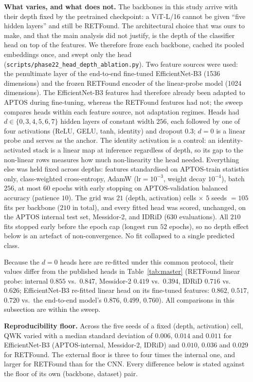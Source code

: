 \documentclass[11pt,a4paper]{article}
\begin{document}
\textbf{What varies, and what does not.} The backbones in this study arrive with
their depth fixed by the pretrained checkpoint: a ViT-L/16 cannot be given
``five hidden layers'' and still be RETFound. The architectural choice that was
ours to make, and that the main analysis did not justify, is the depth of the
classifier head on top of the features. We therefore froze each backbone, cached
its pooled embeddings once, and swept only the head
(\texttt{scripts/}\allowbreak\texttt{phase22\_head\_depth\_ablation.py}). Two feature sources were
used: the penultimate layer of the end-to-end fine-tuned EfficientNet-B3
(1536 dimensions) and the frozen RETFound encoder of the linear-probe model (1024 dimensions).
The EfficientNet-B3 features had therefore already been adapted to APTOS during
fine-tuning, whereas the RETFound features had not; the sweep compares heads
within each feature source, not adaptation regimes. Heads had
$d\in\{0,3,4,5,6,7\}$ hidden layers of constant width $256$, each followed by one
of four activations (ReLU, GELU, tanh, identity) and dropout $0.3$; $d=0$ is a
linear probe and serves as the anchor. The identity activation is a control: an
identity-activated stack is a linear map at inference regardless of depth, so its
gap to the non-linear rows measures how much non-linearity the head needed.
Everything else was held fixed across depths: features standardised on APTOS-train
statistics only, class-weighted cross-entropy, AdamW ($\text{lr}=10^{-3}$, weight
decay $10^{-4}$), batch $256$, at most $60$ epochs with early stopping on
APTOS-validation balanced accuracy (patience $10$). The grid was
$21$ (depth, activation) cells $\times$ $5$ seeds $=105$ fits per backbone
($210$ in total), and every fitted head was scored, unchanged, on the APTOS
internal test set, Messidor-2, and IDRiD ($630$ evaluations). All $210$ fits
stopped early before the epoch cap (longest run $52$ epochs), so no depth effect
below is an artefact of non-convergence. No fit collapsed to a single predicted
class.

Because the $d=0$ heads here are re-fitted under this common protocol, their
values differ from the published heads in Table~\ref{tab:master} (RETFound linear
probe: internal $0.855$ vs.\ $0.847$, Messidor-2 $0.419$ vs.\ $0.394$, IDRiD
$0.716$ vs.\ $0.626$; EfficientNet-B3 re-fitted linear head on its fine-tuned
features: $0.862$, $0.517$, $0.720$ vs.\ the end-to-end model's $0.876$,
$0.499$, $0.760$). All comparisons in this subsection are within the sweep.

\textbf{Reproducibility floor.} Across the five seeds of a fixed (depth,
activation) cell, QWK varied with a median standard deviation of $0.006$, $0.014$
and $0.011$ for EfficientNet-B3 (APTOS-internal, Messidor-2, IDRiD) and $0.010$,
$0.036$ and $0.029$ for RETFound. The external floor is three to four times the
internal one, and larger for RETFound than for the CNN. Every difference below is
stated against the floor of its own (backbone, dataset) pair.
\end{document}
